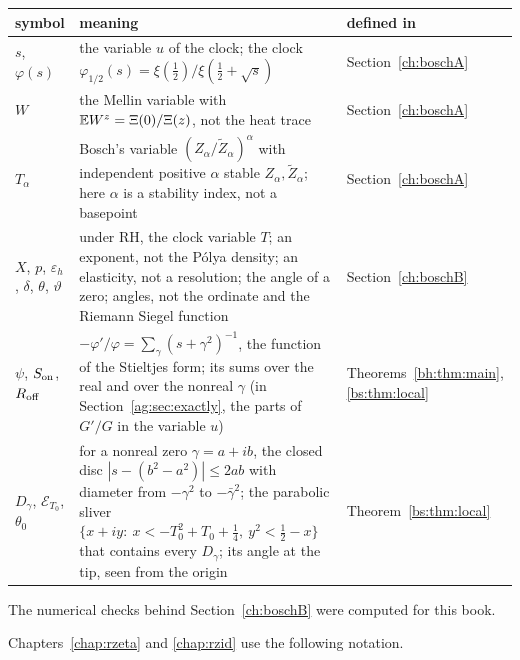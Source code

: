 {\small
\begin{longtable}{@{}p{}p{}p{}@{}}
\toprule
symbol & meaning & defined in\\
\midrule
\endhead
$s$, $\varphi(s)$ & \raggedright the variable $u$ of the clock; the clock ${\varphi_{1/2}(s)=\xi(\frac12)/\xi(\frac12+\sqrt s)}$ & \raggedright Section~\ref{ch:boschA}\tabularnewline
$W$ & \raggedright the Mellin variable with ${\mathbb{E} W^z=\Xi(0)/\Xi(z)}$, not the heat trace & \raggedright Section~\ref{ch:boschA}\tabularnewline
$T_\alpha$ & \raggedright Bosch's variable ${(Z_\alpha/\tilde Z_\alpha)^\alpha}$ with independent positive $\alpha$ stable $Z_\alpha,\tilde Z_\alpha$; here $\alpha$ is a stability index, not a basepoint & \raggedright Section~\ref{ch:boschA}\tabularnewline
$X$, $p$, $\varepsilon_h$, $\delta$, $\theta$, $\vartheta$ & \raggedright under RH, the clock variable $T$; an exponent, not the P\'olya density; an elasticity, not a resolution; the angle of a zero; angles, not the ordinate and the Riemann Siegel function & \raggedright Section~\ref{ch:boschB}\tabularnewline
$\psi$, $S_{\rm on}$, $R_{\rm off}$ & \raggedright $-\varphi'/\varphi=\sum_\gamma(s+\gamma^2)^{-1}$, the function of the Stieltjes form; its sums over the real and over the nonreal $\gamma$ (in Section~\ref{ag:sec:exactly}, the parts of $G'/G$ in the variable $u$) & \raggedright Theorems~\ref{bh:thm:main}, \ref{bs:thm:local}\tabularnewline
$D_\gamma$, $\mathcal E_{T_0}$, $\theta_0$ & \raggedright for a nonreal zero $\gamma=a+ib$, the closed disc ${|s-(b^2-a^2)|\le2ab}$ with diameter from $-\gamma^2$ to $-\bar\gamma^2$; the parabolic sliver ${\{x+iy:\ x<-T_0^2+T_0+\frac14,\ y^2<\frac12-x\}}$ that contains every $D_\gamma$; its angle at the tip, seen from the origin & \raggedright Theorem~\ref{bs:thm:local}\tabularnewline
\bottomrule
\end{longtable}}

The numerical checks behind Section~\ref{ch:boschB} were computed for this book.

Chapters~\ref{chap:rzeta} and \ref{chap:rzid} use the following notation.

